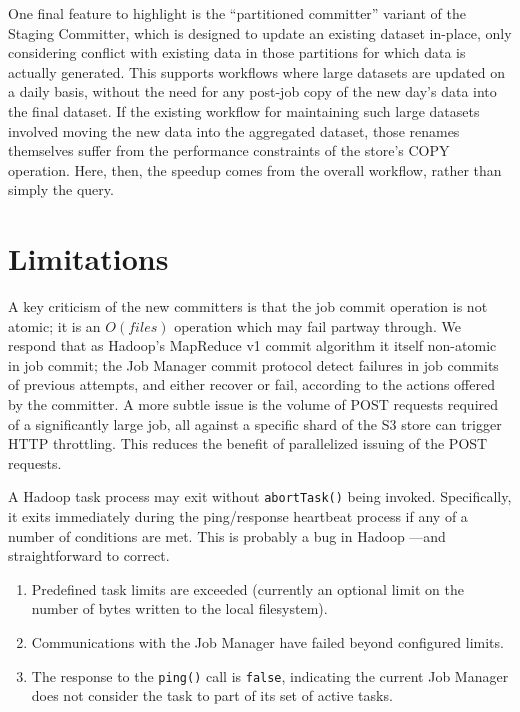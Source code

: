 \documentclass[conference]{IEEEtran}
\begin{document}
One final feature to highlight is the ``partitioned committer'' variant
of the Staging Committer, which is designed to update an existing
dataset in-place, only considering conflict with existing data in
those partitions for which data is actually generated.
This supports workflows where large datasets are updated on a daily basis,
without the need for any post-job copy of the new day's data into the
final dataset.
If the existing workflow for maintaining such large datasets involved
moving the new data into the aggregated dataset, those renames themselves
suffer from the performance constraints of the store's COPY operation.
Here, then, the speedup comes from the overall workflow, rather than
simply the query.



\section{Limitations}
\label{sec:limitations}

A key criticism of the new committers is that the job commit operation is not atomic;
it is an $O(files)$ operation which may fail partway through.
We respond that as Hadoop's MapReduce v1 commit algorithm it itself non-atomic in job commit;
the Job Manager commit protocol detect failures in job commits
of previous attempts, and either recover or fail, according to the actions
offered by the committer.
A more subtle issue is the volume of POST requests required of a significantly large job,
all against a specific shard of the S3 store can trigger HTTP throttling.
This reduces the benefit of parallelized issuing of the POST requests.

A Hadoop task process may exit without \texttt{abortTask()} being invoked.
Specifically, it exits immediately during the ping/response
heartbeat process if any of a number of conditions are met.
This is probably a bug in Hadoop ---and straightforward to correct.

\begin{enumerate}
  \item Predefined task limits are exceeded
  (currently an optional limit on the number of bytes written to the local filesystem).
  \item Communications with the Job Manager have failed beyond configured limits.
  \item The response to the \texttt{ping()} call is \texttt{false}, indicating the current
  Job Manager does not consider the task to part of its set of active tasks.
\end{enumerate}
\end{document}
